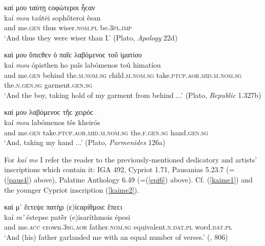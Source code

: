 \begin{exe}
\ex καί μου ταύτῃ ϲοφώτεροι ἦϲαν\\
\gll kaí \emph{mou} taútēi sophṓteroi êsan\\
and me.\textsc{gen} thus wiser.\textsc{nom.pl} be.\textsc{3pl.imp}\\
\trans `And thus they were wiser than I.' (Plato, \textit{Apology} 22d)
\label{kaimou5}
\end{exe}

\begin{exe}
\ex καί μου ὄπιϲθεν ὁ παῖϲ λαβόμενοϲ τοῦ ἱματίου\\
\gll kaí \emph{mou} ópisthen ho paîs labómenos toû himatíou\\
and me.\textsc{gen} behind the.\textsc{m.nom.sg} child.\textsc{m.nom.sg} take.\textsc{ptcp.aor.mid.m.nom.sg} the.\textsc{n.gen.sg} garment.\textsc{gen.sg}\\
\trans `And the boy, taking hold of my garment from behind ...' (Plato, \textit{Republic} 1.327b)
\label{kaimou6}
\end{exe}

\begin{exe}
\ex καί μου λαβόμενοϲ τῆϲ χειρόϲ\\
\gll kaí \emph{mou} labómenos tês kheirós\\
and me.\textsc{gen} take.\textsc{ptcp.aor.mid.m.nom.sg} the.\textsc{f.gen.sg} hand.\textsc{gen.sg}\\
\trans `And, taking my hand ...' (Plato, \textit{Parmenides} 126a)
\label{kaimou7}
\end{exe}

For \textit{kaí me} I refer the reader to the previously-mentioned dedicatory and artists' inscriptions which contain it: IGA 492, Cypriot \citet{Deecke1884} 1.71, Pausanias 5.23.7 (=(\ref{paus4}) above), Palatine Anthology 6.49 (=(\ref{epi6}) above). Cf. (\ref{kaime1}) and the younger Cypriot inscription (\ref{kaime2}). 

\begin{exe}
\ex καί μ᾽ ἔϲτεψε πατὴρ (ε)ἰϲαρίθμοιϲ ἔπεϲι\\
\gll kaí \emph{m'} éstepse patḕr (e)isaríthmois épesi\\
and me.\textsc{acc} crown.\textsc{3sg.aor} father.\textsc{nom.sg}
equivalent.\textsc{n.dat.pl} word.\textsc{dat.pl}\\
\trans `And (his) father garlanded me with an equal number of verses.' (\citealp{Kaibel1878}, 806)
\label{kaime1}
\end{exe}

